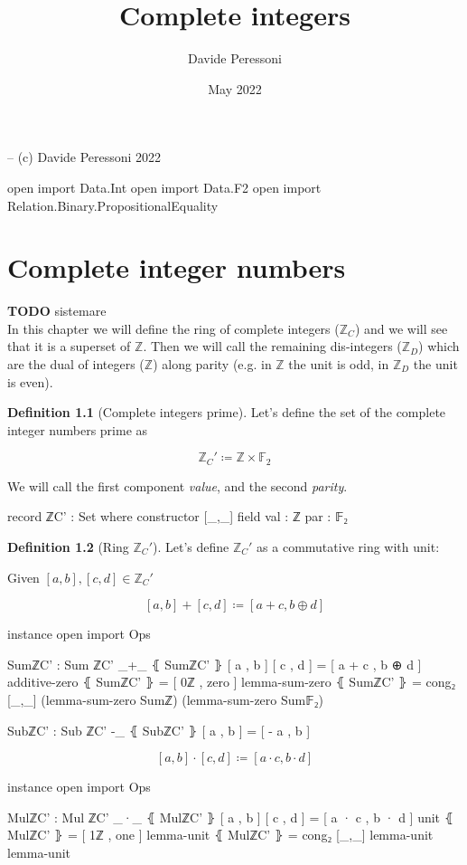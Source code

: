 \documentclass[a4paper]{report}
\title{Complete integers}
\author{Davide Peressoni}
\date{May 2022}
\theoremstyle{definition}
\newtheorem{definition}{Definition}
\newcommand\bZ{\mathbb{Z}}
\newcommand\bF{\mathbb{F}}
\begin{document}
\maketitle

\begin{code}
-- (c) Davide Peressoni 2022

open import Data.Int
open import Data.F2
open import Relation.Binary.PropositionalEquality
\end{code}

\chapter{Complete integer numbers}

\textbf{TODO} sistemare\\
In this chapter we will define the ring of complete integers ($\bZ_C$) and we will
see that it is a superset of $\bZ$. Then we will call the remaining dis-integers
($\bZ_D$) which are the dual of integers ($\bZ$) along parity (e.g. in $\bZ$ the unit is
odd, in $\bZ_D$ the unit is even).

\begin{definition}[Complete integers prime]
Let's define the set of the complete integer numbers prime as

\[\bZ_C' \coloneqq \bZ\times\bF_2\]

We will call the first component \emph{value}, and the second \emph{parity}.

\begin{code}
record ℤC' : Set where
  constructor [_,_]
  field
    val : ℤ
    par : 𝔽₂
\end{code}
\end{definition}

\begin{definition}[Ring $\bZ_C'$]
Let's define $\bZ_C'$ as a commutative ring with unit:

Given $[a,b], [c,d] \in \bZ_C'$

\[[a,b] + [c,d] \coloneqq [a+c, b\oplus d]\]

\begin{code}
instance
  open import Ops

  SumℤC' : Sum ℤC'
  _+_ ⦃ SumℤC' ⦄ [ a , b ] [ c , d ] = [ a + c , b ⊕ d ]
  additive-zero ⦃ SumℤC' ⦄ = [ 0ℤ , zero ]
  lemma-sum-zero ⦃ SumℤC' ⦄ = cong₂ [_,_] (lemma-sum-zero Sumℤ) (lemma-sum-zero Sum𝔽₂)

  SubℤC' : Sub ℤC'
  -_ ⦃ SubℤC' ⦄ [ a , b ] = [ - a , b ]
\end{code}

\[[a,b] \cdot [c,d] \coloneqq [a\cdot c, b\cdot d]\]

\begin{code}
instance
  open import Ops

  MulℤC' : Mul ℤC'
  _·_ ⦃ MulℤC' ⦄ [ a , b ] [ c , d ] = [ a · c , b · d ]
  unit ⦃ MulℤC' ⦄ = [ 1ℤ , one ]
  lemma-unit ⦃ MulℤC' ⦄ = cong₂ [_,_] lemma-unit lemma-unit
\end{code}
\end{definition}
\end{document}
